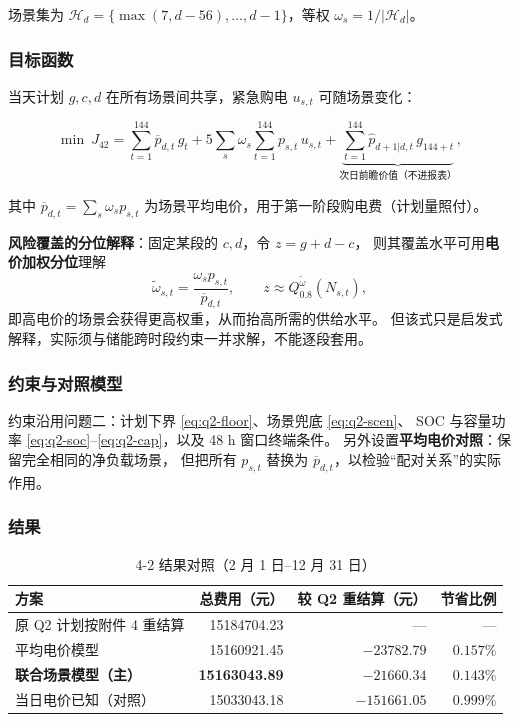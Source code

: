 场景集为 $\mathcal H_d=\{\max(7,d-56),\dots,d-1\}$，等权 $\omega_s=1/|\mathcal H_d|$。

\subsubsection{目标函数}

当天计划 $g,c,d$ 在所有场景间共享，紧急购电 $u_{s,t}$ 可随场景变化：

\begin{equation}
\min\ J_{42}=\sum_{t=1}^{144}\overline p_{d,t}\,g_t
+5\sum_s\omega_s\sum_{t=1}^{144}p_{s,t}\,u_{s,t}
+\underbrace{\sum_{t=1}^{144}\hat p_{d+1|d,t}\,g_{144+t}}_{\text{次日前瞻价值（不进报表）}},
\label{eq:q4-obj}
\end{equation}

其中 $\overline p_{d,t}=\sum_s\omega_s p_{s,t}$ 为场景平均电价，用于第一阶段购电费（计划量照付）。

\textbf{风险覆盖的分位解释}：固定某段的 $c,d$，令 $z=g+d-c$，
则其覆盖水平可用\textbf{电价加权分位}理解
\begin{equation}
\widetilde\omega_{s,t}=\frac{\omega_s p_{s,t}}{\overline p_{d,t}},\qquad
z\approx Q^{\widetilde\omega}_{0.8}(N_{s,t}),
\end{equation}
即高电价的场景会获得更高权重，从而抬高所需的供给水平。
但该式只是启发式解释，实际须与储能跨时段约束一并求解，不能逐段套用。

\subsubsection{约束与对照模型}

约束沿用问题二：计划下界 \eqref{eq:q2-floor}、场景兜底 \eqref{eq:q2-scen}、
SOC 与容量功率 \eqref{eq:q2-soc}--\eqref{eq:q2-cap}，以及 48 h 窗口终端条件。
另外设置\textbf{平均电价对照}：保留完全相同的净负载场景，
但把所有 $p_{s,t}$ 替换为 $\overline p_{d,t}$，以检验“配对关系”的实际作用。

\subsubsection{结果}

\begin{table}[H]
\centering
\caption{4-2 结果对照（2 月 1 日--12 月 31 日）}
\label{tab:q42}
\begin{tabular}{@{}l r r r@{}}
\toprule
方案 & {总费用（元）} & {较 Q2 重结算（元）} & {节省比例} \\
\midrule
原 Q2 计划按附件 4 重结算 & 15184704.23 & — & — \\
平均电价模型              & 15160921.45 & $-23782.79$ & $0.157\%$ \\
\textbf{联合场景模型（主）} & \bfseries 15163043.89 & \bfseries $-21660.34$ & $0.143\%$ \\
当日电价已知（对照）       & 15033043.18 & $-151661.05$ & $0.999\%$ \\
\bottomrule
\end{tabular}
\end{table}

